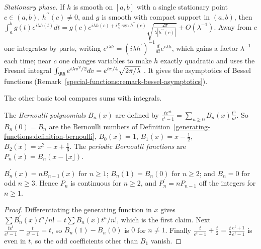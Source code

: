 \begin{remark}\label{special-functions:remark-stationary-phase}
\emph{Stationary phase.} If $h$ is smooth on $[a, b]$ with a single stationary point $c \in (a, b)$, $h^{\prime\prime}(c) \neq 0$, and $g$ is smooth with compact support in $(a, b)$, then
$\int_a^bg(t)e^{i\lambda h(t)}dt = g(c)e^{i\lambda h(c) + i\frac\pi4\operatorname{sgn}h^{\prime\prime}(c)}\sqrt{\frac{2\pi}{\lambda|h^{\prime\prime}(c)|}} + O(\lambda^{-1})$. Away from $c$ one integrates by parts, writing
$e^{i\lambda h} = (i\lambda h^{\prime})^{-1}\frac{d}{dt}e^{i\lambda h}$, which gains a factor $\lambda^{-1}$ each time; near $c$ one changes variables to make $h$ exactly quadratic and uses the Fresnel integral
$\int_\RR e^{i\lambda v^2/2}dv = e^{i\pi/4}\sqrt{2\pi/\lambda}$ \cite{olver-asymptotics}. It gives the asymptotics of Bessel functions (Remark~\ref{special-functions:remark-bessel-asymptotics}).
\end{remark}

The other basic tool compares sums with integrals.

\begin{definition}\label{special-functions:definition-bernoulli-polynomials}
The \emph{Bernoulli polynomials} $B_n(x)$ are defined by $\frac{te^{xt}}{e^t - 1} = \sum_{n \geq 0}B_n(x)\frac{t^n}{n!}$. So $B_n(0) = B_n$ are the Bernoulli numbers of
Definition~\ref{generating-functions:definition-bernoulli}, $B_0(x) = 1$, $B_1(x) = x - \frac12$, $B_2(x) = x^2 - x + \frac16$. The \emph{periodic Bernoulli functions} are $P_n(x) = B_n(x - \lfloor x\rfloor)$.
\end{definition}

\begin{lemma}\label{special-functions:lemma-bernoulli-polynomials}
$B_n^{\prime}(x) = nB_{n-1}(x)$ for $n \geq 1$; $B_n(1) = B_n(0)$ for $n \geq 2$; and $B_n = 0$ for odd $n \geq 3$. Hence $P_n$ is continuous for $n \geq 2$, and $P_n^{\prime} = nP_{n-1}$ off the integers for $n \geq 1$.
\end{lemma}

\begin{proof}
Differentiating the generating function in $x$ gives $\sum B_n^{\prime}(x)t^n/n! = t\sum B_n(x)t^n/n!$, which is the first claim. Next $\frac{te^t}{e^t - 1} - \frac{t}{e^t - 1} = t$, so $B_n(1) - B_n(0)$ is $0$ for $n \neq 1$. Finally
$\frac{t}{e^t - 1} + \frac t2 = \frac t2\frac{e^t + 1}{e^t - 1}$ is even in $t$, so the odd coefficients other than $B_1$ vanish.
\end{proof}

